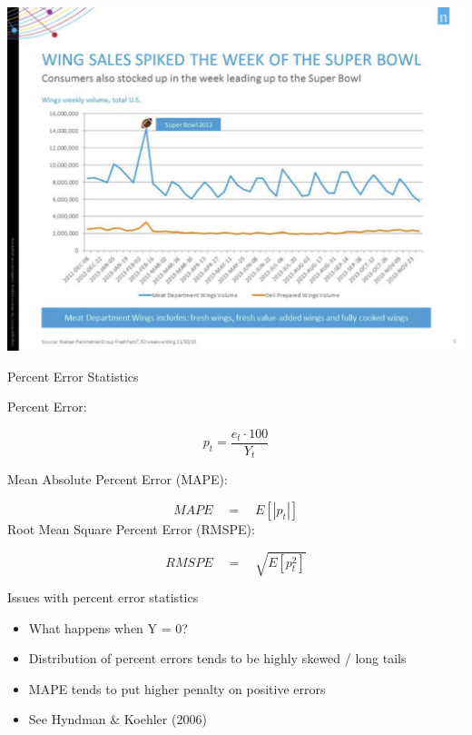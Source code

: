 \documentclass[ignorenonframetext,]{beamer}
\begin{document}
\begin{frame}[fragile]
\begin{block}{}
\begin{center}\includegraphics[width=800px]{wing_sales} \end{center}

\end{block}

\begin{block}{Percent Error Statistics}

Percent Error:

\[{ p }_{ t }=\frac { { e }_{ t }\cdot 100 }{ { Y }_{ t } }\]

Mean Absolute Percent Error (MAPE):

\[MAPE\quad =\quad E\left[ \left| { p }_{ t } \right|  \right]\] Root
Mean Square Percent Error (RMSPE):

\[RMSPE\quad =\quad \sqrt { E\left[ { p }_{ t }^{ 2 } \right]  }\]

\end{block}

\begin{block}{Issues with percent error statistics}

\begin{itemize}
\item
  What happens when Y = 0?
\item
  Distribution of percent errors tends to be highly skewed / long tails
\item
  MAPE tends to put higher penalty on positive errors
\item
  See Hyndman \& Koehler (2006)
\end{itemize}

\end{block}


\end{frame}
\end{document}
